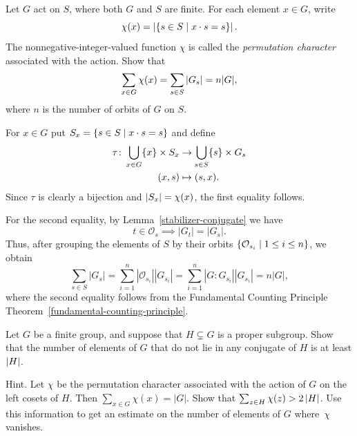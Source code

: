 \begin{probl}\label{permutation-character-equation}
    Let $G$ act on $S$, where both $G$ and $S$ are finite. For each element\/ $x\in G$, write
    $$
        \chi(x) = \left\vert{\{s\in S \mid x\cdot s = s \}}\right\vert.
    $$
    The nonnegative-integer-valued function $\chi$ is called the \textsl{permutation character} associated with the action. Show that
    $$
        \sum_{x \in G}\chi(x) = \sum_{s\in S}\left\vert{G_s}\right\vert= n|G|,
    $$
    where\/ $n$ is the number of orbits of\/ $G$ on\/ $S$.
\end{probl}

\begin{solution} For $x\in G$ put $S_x=\{s\in S\mid x\cdot s=s\}$ and define
\begin{align*}
    \tau\colon \bigcup_{x\in G}\{x\}\times S_x&\to\bigcup_{s\in S}\{s\}\times G_s\\
    (x,s) &\mapsto(s,x).
\end{align*}
Since $\tau$ is clearly a bijection and $\left\vert{S_x}\right\vert=\chi(x)$, the first equality follows.

\medskip

For the second equality, by Lemma~\ref{stabilizer-conjugate} we have
$$
    t \in \mathcal O_s \implies |G_t|=|G_s|.
$$
Thus, after grouping the elements of $S$ by their orbits $\{\mathcal O_{s_i}\mid 1\le i\le n\}$, we obtain
$$
    \sum_{s\in S}|G_s|
        = \sum_{i=1}^n|\mathcal O_{s_i}||G_{s_i}|
        =\sum_{i=1}^n|G:G_{s_i}||G_{s_i}|
        = n|G|,
$$
where the second equality follows from the Fundamental Counting Principle Theorem~\ref{fundamental-counting-principle}.

\end{solution}

\begin{probl}\label{problem-1.A.7}
    Let $G$ be a finite group, and suppose that $H \varsubsetneq G$ is a proper subgroup. Show that the number of elements of\/ $G$ that do not lie in any conjugate of\/ $H$ is at least\/ $\left\vert{H}\right\vert$.

    \textrm{\upshape Hint. Let $\chi$ be the permutation character associated with the action of\/ $G$ on the left cosets of $H$. Then $\sum_{x \in G}\chi(x) = |G|$. Show that $\sum_{z \in H}\chi(z) > 2\left\vert{H}\right\vert$. Use this information to get an estimate on the number of elements of\/ $G$ where~$\chi$ vanishes.}
\end{probl}

